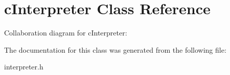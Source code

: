 \hypertarget{classcInterpreter}{\section{c\-Interpreter Class Reference}
\label{classcInterpreter}
}


Collaboration diagram for c\-Interpreter\-:


The documentation for this class was generated from the following file\-:\begin{DoxyCompactItemize}
\item 
interpreter.\-h\end{DoxyCompactItemize}
